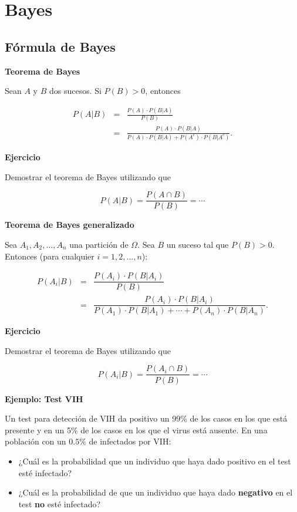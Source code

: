 \documentclass[
  letterpaper,
  DIV=11,
  numbers=noendperiod]{scrreprt}
\providecommand{\tightlist}{%
  \setlength{\itemsep}{0pt}\setlength{\parskip}{0pt}}\usepackage{longtable,booktabs,array}
\begin{document}
\hypertarget{bayes}{%
\section{Bayes}\label{bayes}}

\hypertarget{fuxf3rmula-de-bayes}{%
\subsection{Fórmula de Bayes}\label{fuxf3rmula-de-bayes}}

\textbf{Teorema de Bayes}

Sean \(A\) y \(B\) dos sucesos. Si \(P(B)>0\), entonces

\begin{eqnarray*}
P(A|B) & = & \frac{P(A)\cdot P(B\big|A)}{P(B)}\\
&=& \frac{P(A)\cdot P(B\big|A)}{P(A)\cdot P(B\big|A)+P(A^c)\cdot P(B\big|A^c)}.
\end{eqnarray*}

\textbf{Ejercicio}

Demostrar el teorema de Bayes utilizando que

\[P(A|B) =\frac{P(A\cap B)}{P(B)}=\cdots\]

\textbf{Teorema de Bayes generalizado}

Sea \(A_1,A_2,\ldots,A_n\) una partición de \(\Omega\). Sea \(B\) un
suceso tal que \(P(B)>0\). Entonces (para cualquier \(i=1,2,\ldots,n\)):

\begin{eqnarray*}
P(A_i|B) & =& \dfrac{P(A_i)\cdot P(B|A_i)}{P(B)}\\
& =& \dfrac{P(A_i)\cdot P(B|A_i)}{P(A_1)\cdot P(B|A_1)+\cdots+P(A_n)\cdot P(B|A_n)}.
\end{eqnarray*}

\textbf{Ejercicio}

Demostrar el teorema de Bayes utilizando que

\[P(A_i|B) =\dfrac{P(A_i\cap B)}{P(B)}=\cdots\]

\textbf{Ejemplo: Test VIH}

Un test para detección de VIH da positivo un 99\% de los casos en los
que está presente y en un 5\% de los casos en los que el virus está
ausente. En una población con un \(0.5\%\) de infectados por VIH:

\begin{itemize}
\tightlist
\item
  ¿Cuál es la probabilidad que un individuo que haya dado positivo en el
  test esté infectado?
\item
  ¿Cuál es la probabilidad de que un individuo que haya dado
  \textbf{negativo} en el test \textbf{no} esté infectado?
\end{itemize}
\end{document}

